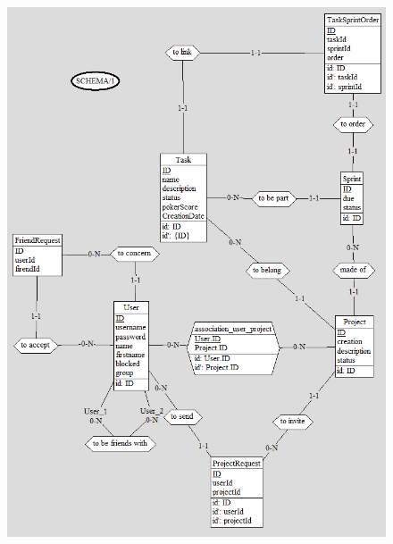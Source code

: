 \documentclass{article}
\begin{document}
\begin{figure}
  \includegraphics{databaseDiagram.png}  
  \label{fig:Database graph}
\end{figure}
\end{document}
